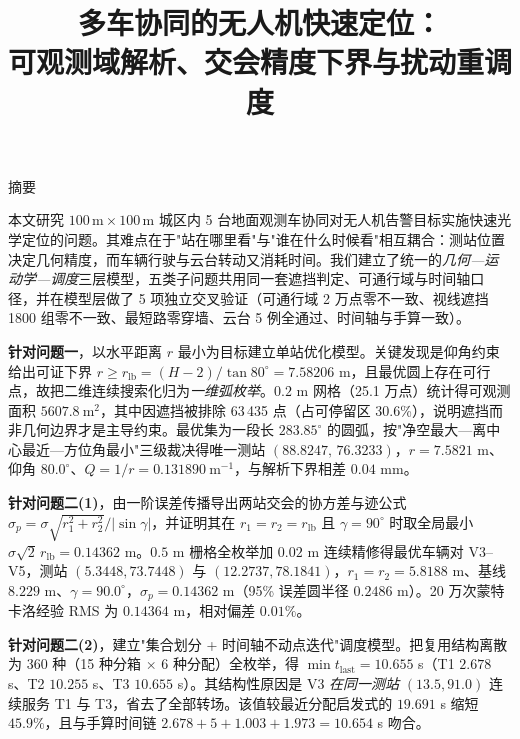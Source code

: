 \documentclass[UTF8,a4paper,zihao=-4,oneside]{ctexart}
\title{\heiti\zihao{2} 多车协同的无人机快速定位：\\[2pt]
可观测域解析、交会精度下界与扰动重调度}
\author{}
\date{}
\begin{document}
\maketitle

\begin{center}
  {\heiti{} 摘\quad 要}
\end{center}

\begingroup{}\linespread{1.06}\selectfont
本文研究 $100\,\mathrm{m}\times100\,\mathrm{m}$ 城区内 5 台地面观测车协同对无人机告警目标实施快速光学定位的问题。其难点在于"站在哪里看"与"谁在什么时候看"相互耦合：测站位置决定几何精度，而车辆行驶与云台转动又消耗时间。我们建立了统一的\emph{几何—运动学—调度}三层模型，五类子问题共用同一套遮挡判定、可通行域与时间轴口径，并在模型层做了 5 项独立交叉验证（可通行域 2 万点零不一致、视线遮挡 1800 组零不一致、最短路零穿墙、云台 5 例全通过、时间轴与手算一致）。

\textbf{针对问题一}，以水平距离 $r$ 最小为目标建立单站优化模型。关键发现是仰角约束给出可证下界 $r\ge r_{\mathrm{lb}}=(H-2)/\tan80^\circ=7.58206$ m，且最优圆上存在可行点，故把二维连续搜索化归为\emph{一维弧枚举}。$0.2$ m 网格（25.1 万点）统计得可观测面积 $5607.8\ \mathrm{m^2}$，其中因遮挡被排除 63\,435 点（占可停留区 30.6\%），说明遮挡而非几何边界才是主导约束。最优集为一段长 $283.85^\circ$ 的圆弧，按"净空最大—离中心最近—方位角最小"三级裁决得唯一测站 $(88.8247,\,76.3233)$，$r=7.5821$ m、仰角 $80.0^\circ$、$Q=1/r=0.131890\ \mathrm{m^{-1}}$，与解析下界相差 $0.04$ mm。

\textbf{针对问题二(1)}，由一阶误差传播导出两站交会的协方差与迹公式
$\sigma_p=\sigma\sqrt{r_1^2+r_2^2}/|\sin\gamma|$，并证明其在 $r_1=r_2=r_{\mathrm{lb}}$ 且 $\gamma=90^\circ$ 时取全局最小 $\sigma\sqrt2\,r_{\mathrm{lb}}=0.14362$ m。$0.5$ m 栅格全枚举加 $0.02$ m 连续精修得最优车辆对 V3–V5，测站 $(5.3448,73.7448)$ 与 $(12.2737,78.1841)$，$r_1=r_2=5.8188$ m、基线 $8.229$ m、$\gamma=90.0^\circ$，$\sigma_p=0.14362$ m（95\% 误差圆半径 $0.2486$ m）。20 万次蒙特卡洛经验 RMS 为 $0.14364$ m，相对偏差 $0.01\%$。

\textbf{针对问题二(2)}，建立"集合划分 + 时间轴不动点迭代"调度模型。把复用结构离散为 360 种（15 种分箱 $\times$ 6 种分配）全枚举，得 $\min t_{\mathrm{last}}=10.655$ s（T1 $2.678$ s、T2 $10.255$ s、T3 $10.655$ s）。其结构性原因是 V3 \emph{在同一测站} $(13.5,91.0)$ 连续服务 T1 与 T3，省去了全部转场。该值较最近分配启发式的 $19.691$ s 缩短 $45.9\%$，且与手算时间链 $2.678+5+1.003+1.973=10.654$ s 吻合。
\end{document}
